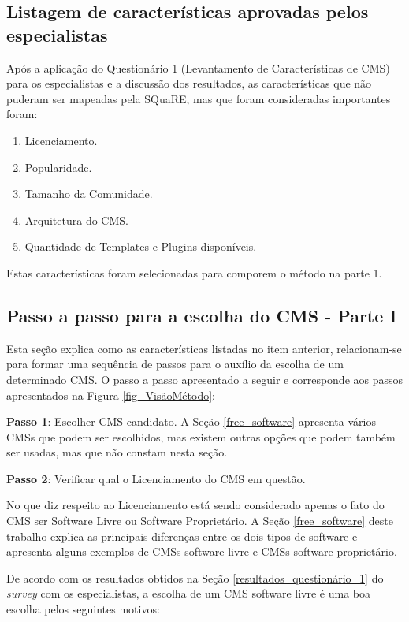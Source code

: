 \subsection{Listagem de características aprovadas pelos especialistas}

Após a aplicação do Questionário 1 (Levantamento de Características de CMS) para os especialistas e a discussão dos resultados, as características que não puderam ser mapeadas pela SQuaRE, mas que foram consideradas importantes foram:

\begin{enumerate}
\item Licenciamento.
\item Popularidade.
\item Tamanho da Comunidade.
\item Arquitetura do CMS.
\item Quantidade de Templates e Plugins disponíveis. 

\end{enumerate}

Estas características foram selecionadas para comporem o método na parte 1. 


\subsection{Passo a passo para a escolha do CMS - Parte I}
\label{M_ParteI}
Esta seção explica como as características listadas no item anterior, relacionam-se para formar uma sequência de passos para o auxílio da escolha de um determinado CMS. O passo a passo apresentado a seguir e corresponde aos passos apresentados na Figura \ref{fig_VisãoMétodo}:

\textbf{Passo 1}: Escolher CMS candidato.
A Seção \ref{free_software} apresenta vários CMSs que podem ser escolhidos, mas existem outras opções que podem também ser usadas, mas que não constam nesta seção.

\textbf{Passo 2}: Verificar qual o Licenciamento do CMS em questão.

No que diz respeito ao Licenciamento está sendo considerado apenas o fato do CMS ser Software Livre ou Software Proprietário. A Seção \ref{free_software} deste trabalho explica as principais diferenças entre os dois tipos de software e apresenta alguns exemplos de CMSs software livre e CMSs software proprietário.

De acordo com os resultados obtidos na Seção \ref{resultados_questionário_1} do \textit{survey} com os  especialistas, a escolha de um CMS software livre é uma boa escolha pelos seguintes motivos:

